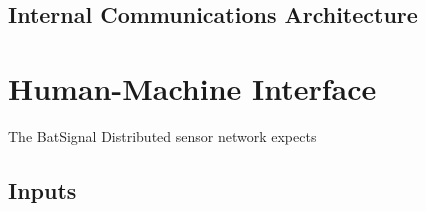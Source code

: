 \documentclass[11pt,a4paper]{article}
\begin{document}
\subsection{Internal Communications Architecture}

\section{Human-Machine Interface}
\textnormal{The BatSignal Distributed sensor network expects }

\subsection{Inputs}
\end{document}
